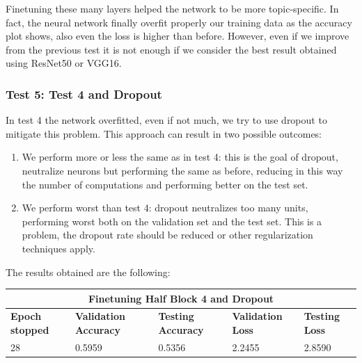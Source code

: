 Finetuning these many layers helped the network to be more topic-specific. In fact, the neural network finally overfit properly our training data as the accuracy plot shows, also even the loss is higher than before. However, even if we improve from the previous test it is not enough if we consider the best result obtained using ResNet50 or VGG16.


\subsubsection{Test 5: Test 4 and Dropout}
In test 4 the network overfitted, even if not much, we try to use dropout to mitigate this problem. This approach can result in two possible outcomes:

\begin{enumerate}
	\item We perform more or less the same as in test 4: this is the goal of dropout, neutralize neurons but performing the same as before, reducing in this way the number of computations and performing better on the test set.
	\item We perform worst than test 4: dropout neutralizes too many units, performing worst both on the validation set and the test set. This is a problem, the dropout rate should be reduced or other regularization techniques apply.
\end{enumerate}

\noindent The results obtained are the following:

\medskip

\begin{tabular}{ |p{2cm}|p{2cm}|p{2cm}|p{2cm}|p{2cm}|  }
\hline
\multicolumn{5}{|c|}{Finetuning Half Block 4 and Dropout} \\
\hline
\textbf{Epoch stopped} & \textbf{Validation Accuracy} & \textbf{Testing Accuracy} & \textbf{Validation Loss} & \textbf{Testing Loss} \\
\hline
28 & 0.5959 & 0.5356 & 2.2455 & 2.8590\\
\hline
\end{tabular}

